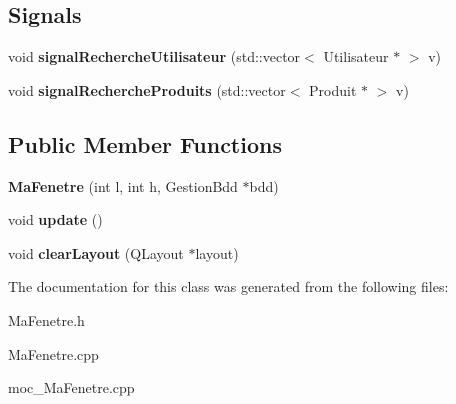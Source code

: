 \subsection*{Signals}
\begin{DoxyCompactItemize}
\item 
void {\bfseries signal\-Recherche\-Utilisateur} (std\-::vector$<$ Utilisateur $\ast$ $>$ v)\label{class_ma_fenetre_aed4dd546bfb6e374aa317946e9247d4f}

\item 
void {\bfseries signal\-Recherche\-Produits} (std\-::vector$<$ Produit $\ast$ $>$ v)\label{class_ma_fenetre_a75cd895beb38fe68a4319eb6c37ac8ee}

\end{DoxyCompactItemize}
\subsection*{Public Member Functions}
\begin{DoxyCompactItemize}
\item 
{\bfseries Ma\-Fenetre} (int l, int h, Gestion\-Bdd $\ast$bdd)\label{class_ma_fenetre_ae39212ca7a4d4b4c99a13b1d5eb063fa}

\item 
void {\bfseries update} ()\label{class_ma_fenetre_a342da912af9b611d47229fd190d68522}

\item 
void {\bfseries clear\-Layout} (Q\-Layout $\ast$layout)\label{class_ma_fenetre_a4bc520a56473760bb8433a1de67da378}

\end{DoxyCompactItemize}


The documentation for this class was generated from the following files\-:\begin{DoxyCompactItemize}
\item 
Ma\-Fenetre.\-h\item 
Ma\-Fenetre.\-cpp\item 
moc\-\_\-\-Ma\-Fenetre.\-cpp\end{DoxyCompactItemize}
